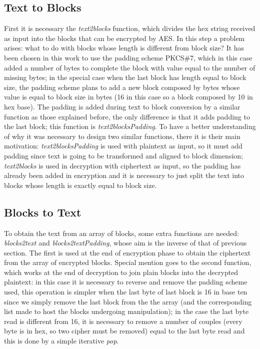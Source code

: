 \documentclass{article}
\begin{document}
\subsection{Text to Blocks}

First it is necessary the \textit{text2blocks} function, which divides the hex string received as input into the blocks that can be encrypted by AES. In this step a problem arises: what to do with blocks whose length is different from block size? It has been chosen in this work to use the padding scheme PKCS\#7, which in this case added a number of bytes to complete the block with value equal to the number of missing bytes; in the special case when the last block has length equal to block size, the padding scheme plans to add a new block composed by bytes whose value is equal to block size in bytes (16 in this case so a block composed by 10 in hex base). The padding is added during text to block conversion by a similar function as those explained before, the only difference is that it adds padding to the last block; this function is \textit{text2blocksPadding}. To have a better understanding of why it was necessary to design two similar functions, there it is their main motivation: \textit{text2blocksPadding} is used with plaintext as input, so it must add padding since text is going to be transformed and aligned to block dimension; \textit{text2blocks} is used in decryption with ciphertext as input, so the padding has already been added in encryption and it is necessary to just split the text into blocks whose length is exactly equal to block size.

\subsection{Blocks to Text}

To obtain the text from an array of blocks, some extra functions are needed: \textit{blocks2text} and \textit{blocks2textPadding}, whose aim is the inverse of that of previous section. The first is used at the end of encryption phase to obtain the ciphertext from the array of encrypted blocks. Special mention goes to the second function, which works at the end of decryption to join plain blocks into the decrypted plaintext: in this case it is necessary to reverse and remove the padding scheme used, this operation is simpler when the last byte of last block is 16 in base ten since we simply remove the last block from the the array (and the corresponding list made to host the blocks undergoing manipulation); in the case the last byte read is different from 16, it is necessary to remove a number of couples (every byte is in hex, so two cipher must be removed) equal to the last byte read and this is done by a simple iterative \textit{pop}. 
\end{document}

